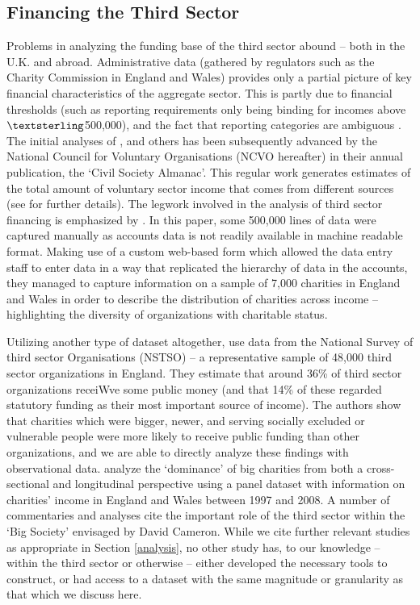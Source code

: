 \documentclass[11pt]{article}
\begin{document}
\subsection{Financing the Third Sector}

Problems in analyzing the funding base of the third sector abound -- both in the U.K. and abroad. Administrative data (gathered by regulators such as the Charity Commission in England and Wales) provides only a partial picture of key financial characteristics of the aggregate sector. This is partly due to financial thresholds (such as reporting requirements only being binding for incomes above $\textsterling$500,000), and the fact that reporting categories are ambiguous \citep[as discussed in][]{Morgan2012}. The initial analyses of \cite{Posnett1993}, \cite{OsborneHems1995} and others has been subsequently advanced by the National Council for Voluntary Organisations (NCVO hereafter) in their annual publication, the `Civil Society Almanac'. This regular work generates estimates of the total amount of voluntary sector income that comes from different sources (see \cite{ncvo2016} for further details). The legwork involved in the analysis of third sector financing is emphasized by \cite{CliffordMohan2016}. In this paper, some 500,000 lines of data were captured manually as accounts data is not readily available in machine readable format. Making use of a custom web-based form which allowed the data entry staff to enter data in a way that replicated the hierarchy of data in the accounts, they managed to capture information on a sample of 7,000 charities in England and Wales in order to describe the distribution of charities across income -- highlighting the diversity of organizations with charitable status. 

Utilizing another type of dataset altogether, \cite{cliffordfreidamohan2010} use data from the National Survey of third sector Organisations (NSTSO) -- a representative sample of 48,000 third sector organizations in England. They estimate that around 36\% of third sector organizations receiWve some public money (and that 14\% of these regarded statutory funding as their most important source of income). The authors show that charities which were bigger, newer, and serving socially excluded or vulnerable people were more likely to receive public funding than other organizations, and we are able to directly analyze these findings with observational data. \cite{backusandclifford2013} analyze the `dominance' of big charities from both a cross-sectional and longitudinal perspective using a panel dataset with information on charities' income in England and Wales between 1997 and 2008. A number of commentaries and analyses cite the important role of the third sector within the `Big Society' envisaged by David Cameron. While we cite further relevant studies as appropriate in Section \ref{analysis}, no other study has, to our knowledge -- within the third sector or otherwise -- either developed the necessary tools to construct, or had access to a dataset with the same magnitude or granularity as that which we discuss here.
\end{document}
